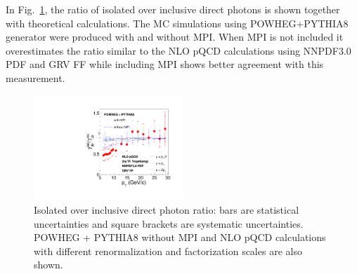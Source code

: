 \documentclass[twocolumn,letterpaper,aps,prl,longbibliography,superscriptaddress,floatfix]{revtex4-2}
\newcommand{\pizero}{\ensuremath{\pi^0}}
\begin{document}

In Fig.~\ref{fig:iso2inc}, the ratio of isolated over inclusive direct photons is shown together with theoretical calculations. The MC simulations using POWHEG+PYTHIA8 generator were produced with and without MPI. When MPI is not included it overestimates the ratio similar to the NLO pQCD calculations using NNPDF3.0 PDF and GRV FF while including MPI shows better agreement with this measurement.

\begin{figure}
\centering
\includegraphics[width=0.5\textwidth]{Iso2Inc}
\caption{Isolated over inclusive direct photon ratio: bars are statistical uncertainties and square brackets are systematic uncertainties. POWHEG + PYTHIA8 without MPI and NLO pQCD calculations with different renormalization and factorization scales are also shown.}
\label{fig:iso2inc}
\end{figure}
\end{document}
